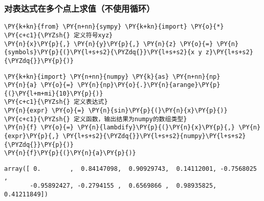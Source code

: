     \hypertarget{ux5bf9ux8868ux8fbeux5f0fux5728ux591aux4e2aux70b9ux4e0aux6c42ux503cux4e0dux4f7fux7528ux5faaux73af}{%
\subsubsection{对表达式在多个点上求值（不使用循环）}\label{ux5bf9ux8868ux8fbeux5f0fux5728ux591aux4e2aux70b9ux4e0aux6c42ux503cux4e0dux4f7fux7528ux5faaux73af}}

    \begin{tcolorbox}[breakable, size=fbox, boxrule=1pt, pad at break*=1mm,colback=cellbackground, colframe=cellborder]
\begin{Verbatim}[commandchars=\\\{\}]
\PY{k+kn}{from} \PY{n+nn}{sympy} \PY{k+kn}{import} \PY{o}{*}
\PY{c+c1}{\PYZsh{} 定义符号xyz}
\PY{n}{x}\PY{p}{,} \PY{n}{y}\PY{p}{,} \PY{n}{z} \PY{o}{=} \PY{n}{symbols}\PY{p}{(}\PY{l+s+s2}{\PYZdq{}}\PY{l+s+s2}{x y z}\PY{l+s+s2}{\PYZdq{}}\PY{p}{)}
\end{Verbatim}
\end{tcolorbox}

    \begin{tcolorbox}[breakable, size=fbox, boxrule=1pt, pad at break*=1mm,colback=cellbackground, colframe=cellborder]
\begin{Verbatim}[commandchars=\\\{\}]
\PY{k+kn}{import} \PY{n+nn}{numpy} \PY{k}{as} \PY{n+nn}{np}
\PY{n}{a} \PY{o}{=} \PY{n}{np}\PY{o}{.}\PY{n}{arange}\PY{p}{(}\PY{l+m+mi}{10}\PY{p}{)} 
\PY{c+c1}{\PYZsh{} 定义表达式}
\PY{n}{expr} \PY{o}{=} \PY{n}{sin}\PY{p}{(}\PY{n}{x}\PY{p}{)}
\PY{c+c1}{\PYZsh{} 定义函数，输出结果为numpy的数组类型}
\PY{n}{f} \PY{o}{=} \PY{n}{lambdify}\PY{p}{(}\PY{n}{x}\PY{p}{,} \PY{n}{expr}\PY{p}{,} \PY{l+s+s2}{\PYZdq{}}\PY{l+s+s2}{numpy}\PY{l+s+s2}{\PYZdq{}}\PY{p}{)}
\PY{n}{f}\PY{p}{(}\PY{n}{a}\PY{p}{)} 
\end{Verbatim}
\end{tcolorbox}

            \begin{tcolorbox}[breakable, size=fbox, boxrule=.5pt, pad at break*=1mm, opacityfill=0]
\begin{Verbatim}[commandchars=\\\{\}]
array([ 0.        ,  0.84147098,  0.90929743,  0.14112001, -0.7568025 ,
       -0.95892427, -0.2794155 ,  0.6569866 ,  0.98935825,  0.41211849])
\end{Verbatim}
\end{tcolorbox}
        
